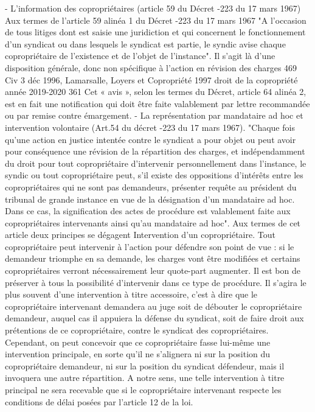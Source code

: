 - L'information des copropriétaires (article 59 du Décret -223 du 17 mars 1967)
Aux termes de l'article 59 alinéa 1 du Décret -223 du 17 mars 1967
"A l'occasion de tous litiges dont est saisie une juridiction et qui concernent le fonctionnement d'un syndicat ou dans lesquels le syndicat est partie, le syndic avise chaque copropriétaire de l'existence et de l'objet de l'instance".
Il s'agit là d'une disposition générale, donc non spécifique à l'action en révision des charges
469 Civ 3 déc 1996, Lamarsalle, Loyers et Copropriété 1997 
droit de la copropriété année 2019-2020
361
Cet « avis », selon les termes du Décret, article 64 alinéa 2, est en fait une notification qui doit être faite valablement par lettre recommandée ou par remise contre émargement.
- La représentation par mandataire ad hoc et intervention volontaire (Art.54 du décret -223 du 17 mars 1967).
"Chaque fois qu'une action en justice intentée contre le syndicat a pour objet ou peut avoir pour conséquence une révision de la répartition des charges, et indépendamment du droit pour tout copropriétaire d'intervenir personnellement dans l'instance, le syndic ou tout copropriétaire peut, s'il existe des oppositions d'intérêts entre les copropriétaires qui ne sont pas demandeurs, présenter requête au président du tribunal de grande instance en vue de la désignation d'un mandataire ad hoc. Dans ce cas, la signification des actes de procédure est valablement faite aux copropriétaires intervenants ainsi qu'au mandataire ad hoc".
Aux termes de cet article deux principes se dégagent
Intervention d'un copropriétaire.
Tout copropriétaire peut intervenir à l'action pour défendre son point de vue : si le demandeur triomphe en sa demande, les charges vont être modifiées et certains copropriétaires verront nécessairement leur quote-part augmenter. Il est bon de préserver à tous la possibilité d'intervenir dans ce type de procédure.
Il s’agira le plus souvent d’une intervention à titre accessoire, c’est à dire que le copropriétaire intervenant demandera au juge soit de débouter le copropriétaire demandeur, auquel cas il appuiera la défense du syndicat, soit de faire droit aux prétentions de ce copropriétaire, contre le syndicat des copropriétaires.
Cependant, on peut concevoir que ce copropriétaire fasse lui-même une intervention principale, en sorte qu’il ne s’alignera ni sur la position du copropriétaire demandeur, ni sur la position du syndicat défendeur, mais il invoquera une autre répartition. A notre sens, une telle intervention à titre principal ne sera recevable que si le copropriétaire intervenant respecte les conditions de délai posées par l’article 12 de la loi.
